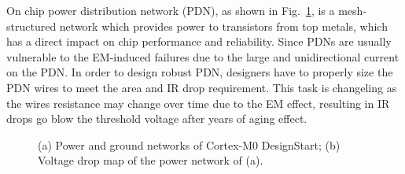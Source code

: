 On chip power distribution network (PDN), as shown in Fig.~\ref{fig:pgimage}, is a mesh-structured network which provides power to transistors from top metals,  which has a direct impact on chip performance and reliability. Since PDNs are usually vulnerable to the EM-induced failures due to the large and unidirectional current on the PDN. In order to design robust PDN, designers have to properly size the PDN wires to meet the area and IR drop requirement. This task is changeling as the wires resistance may change over time due to the EM effect, resulting in IR drops go blow the threshold voltage  after years of aging effect.
\begin{figure}[htp]
	\centering
	\caption{(a) Power and ground networks of Cortex-M0 DesignStart; (b) Voltage drop map of the power network of (a).}
	\label{fig:pgimage}
\end{figure}


